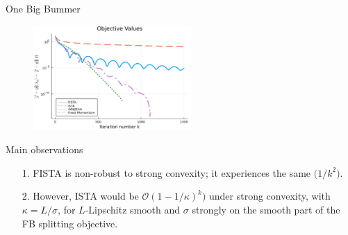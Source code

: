 \documentclass[11pt]{beamer}
\theoremstyle{definition}
\begin{document}
    \begin{frame}{One Big Bummer}
        \begin{figure}
            \includegraphics[width=6cm]{Assets/obj_vals.png}
        \end{figure}
        Main observations
        \begin{itemize}
            \item [1.] FISTA is non-robust to strong convexity; it experiences the same $\mathcal (1/k^2)$. 
            \item [2.] However, ISTA would be $\mathcal O(1 - 1/\kappa)^k)$ under strong convexity, with $\kappa = L/\sigma$, for $L$-Lipschitz smooth and $\sigma$ strongly on the smooth part of the FB splitting objective. 
        \end{itemize}
    \end{frame}
        
    
\end{document}
